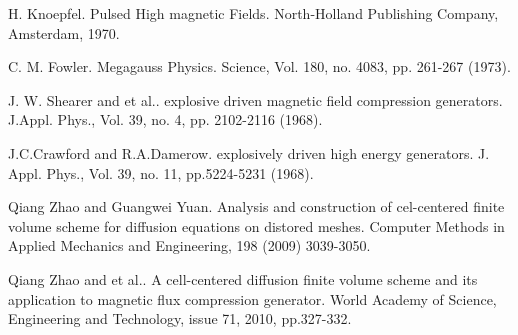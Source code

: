 
\begin{thebibliography}{10}

{\sc H. Knoepfel}. {Pulsed High magnetic Fields}. North-Holland Publishing Company, Amsterdam, 1970.



{\sc C. M. Fowler}. {Megagauss Physics}. Science, Vol. 180, no. 4083, pp. 261-267 (1973).



{\sc J. W. Shearer and et al.}. {explosive driven magnetic field compression generators}. J.Appl. Phys., Vol. 39, no. 4, pp. 2102-2116 (1968).



{\sc J.C.Crawford and R.A.Damerow}. {explosively driven high energy generators}. J. Appl. Phys., Vol. 39, no. 11, pp.5224-5231 (1968).



{\sc Qiang Zhao and Guangwei Yuan}. {Analysis and construction of cel-centered finite volume scheme for diffusion equations on distored meshes}. Computer Methods in Applied Mechanics and Engineering, 198 (2009) 3039-3050.



{\sc Qiang Zhao and et al.}. {A cell-centered diffusion finite volume scheme and its application to magnetic flux compression generator}. World Academy of Science, Engineering and Technology, issue 71, 2010, pp.327-332.

\end{thebibliography}
